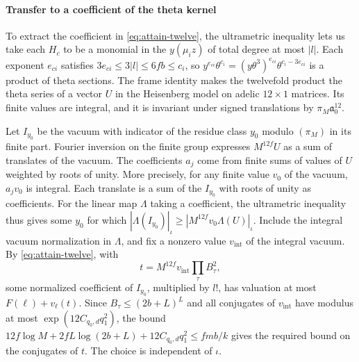 \paragraph{Transfer to a coefficient of the theta kernel}
To extract the coefficient in \eqref{eq:attain-twelve}, the ultrametric
inequality lets us take each \(H_c\) to be a monomial in the \(y(\mu_i z)\)
of total degree at most \(|l|\). Each exponent \(e_{ci}\) satisfies
\(3e_{ci}\le3|l|\le6fb\le c_i\), so
\(y^{e_{ci}}\theta^{c_i}=(y\theta^3)^{e_{ci}}\theta^{c_i-3e_{ci}}\)
is a product of theta sections. The frame identity makes the twelvefold
product the theta series of a vector \(U\) in the Heisenberg model on
adelic \(12\times1\) matrices. Its finite values are integral, and it
is invariant under signed translations by \(\pi_M\mathfrak a_0^{12}\).

Let \(I_{y_0}\) be the vacuum with indicator of the residue class \(y_0\)
modulo \((\pi_M)\) in its finite part.
Fourier inversion on the finite group expresses \(M^{12f}U\) as a sum
of translates of the vacuum. The coefficients \(a_j\) come from finite
sums of values of \(U\) weighted by roots of unity. More precisely,
for any finite value \(v_0\) of the vacuum, \(a_jv_0\) is integral.
Each translate is a sum of the \(I_{y_0}\) with roots of unity as
coefficients. For the linear map \(\Lambda\) taking a coefficient,
the ultrametric inequality thus gives some \(y_0\) for which
\(|\Lambda(I_{y_0})|_\iota\ge|M^{12f}v_0\Lambda(U)|_\iota\).
Include the integral vacuum normalization in \(\Lambda\), and fix a nonzero
value \(v_\mathrm{int}\) of the integral vacuum. By \eqref{eq:attain-twelve},
with
\[
 t=M^{12f}v_\mathrm{int}\prod_\tau B_\tau^2 ,
\]
some normalized coefficient of \(I_{y_0}\), multiplied by \(l!\), has
valuation at most \(F(\ell)+v_\ell(t)\).
Since \(B_\tau\le(2b+L)^L\) and all conjugates of \(v_\mathrm{int}\) have
modulus at most \(\exp(12C_{q_0,d}q_1^2)\), the bound
\(12f\log M+2fL\log(2b+L)+12C_{q_0,d}q_1^2\le fmb/k\) gives the
required bound on the conjugates of \(t\). The choice is independent
of \(\iota\).
